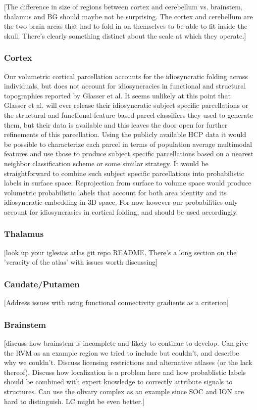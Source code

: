 \documentclass[10pt,letterpaper]{article}
\begin{document}
[The difference in size of regions between cortex and cerebellum vs. brainstem, thalamus and BG should maybe not be surprising. The cortex and cerebellum are the two brain areas that had to fold in on themselves to be able to fit inside the skull. There's clearly something distinct about the scale at which they operate.]

\subsubsection{Cortex} Our volumetric cortical parcellation accounts for the idiosyncratic folding across individuals, but does not account for idiosyncracies in functional and structural topographies reported by Glasser et al. It seems unlikely at this point that Glasser et al. will ever release their idiosyncratic subject specific parcellations or the structural and functional feature based parcel classifiers they used to generate them, but their data is available and this leaves the door open for further refinements of this parcellation. Using the publicly available HCP data it would be possible to characterize each parcel in terms of population average multimodal features and use those to produce subject specific parcellations based on a nearest neighbor classification scheme or some similar strategy. It would be straightforward to combine such subject specific parcellations into probabilistic labels in surface space. Reprojection from surface to volume space would produce volumetric probabilistic labels that account for both area identity and its idiosyncratic embedding in 3D space. For now however our probabilities only account for idiosyncrasies in cortical folding, and should be used accordingly.

\subsubsection{Thalamus} [look up your iglesias atlas git repo README. There's a long section on the 'veracity of the atlas' with issues worth discussing]

\subsubsection{Caudate/Putamen} [Address issues with using functional connectivity gradients as a criterion]

\subsubsection{Brainstem} [discuss how brainstem is incomplete and likely to continue to develop. Can give the RVM as an example region we tried to include but couldn't, and describe why we couldn't. Discuss licensing restrictions and alternative atlases (or the lack thereof). Discuss how localization is a problem here and how probablistic labels should be combined with expert knowledge to correctly attribute signals to structures. Can use the olivary complex as an example since SOC and ION are hard to distinguish. LC might be even better.]
\end{document}
